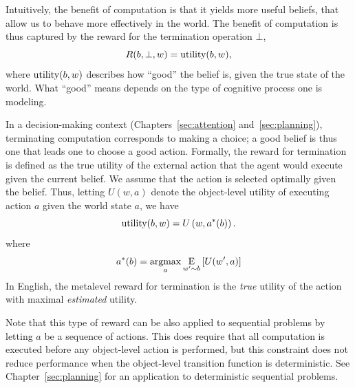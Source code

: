 Intuitively, the benefit of computation is that it yields more useful beliefs, that allow us to behave more effectively in the world. The benefit of computation is thus captured by the reward for the termination operation $\bot$,
%
\begin{equation}
  R(b, \bot, w) = \utility(b, w),
\end{equation}
%
where $\utility(b, w)$ describes how ``good'' the belief is, given the true state of the world. What ``good'' means depends on the type of cognitive process one is modeling. 

In a decision-making context (Chapters~\ref{sec:attention} and~\ref{sec:planning}), terminating computation corresponds to making a choice; a good belief is thus one that leads one to choose a good action. Formally, the reward for termination is defined as the true utility of the external action\footnotemark{} that the agent would execute given the current belief. We assume that the action is selected optimally given the belief. Thus, letting $U(w, a)$ denote the object-level utility of executing action $a$ given the world state $a$, we have
%
\begin{equation}\label{eq:term-reward}
\utility(b, w) = U\left(w, a^*(b)\right).
\end{equation}
%
where
\begin{equation}
  a^*(b) = \argmax_a \expectunder{U(w', a)}{w' \sim b}
\end{equation}
%
In English, the metalevel reward for termination is the \emph{true} utility of the action\footnotemark{} with maximal \emph{estimated} utility.


Note that this type of reward can be also applied to sequential problems by letting $a$ be a sequence of actions. This does require that all computation is executed before any object-level action is performed, but this constraint does not reduce performance when the object-level transition function is deterministic. See Chapter~\ref{sec:planning} for an application to deterministic sequential problems.

